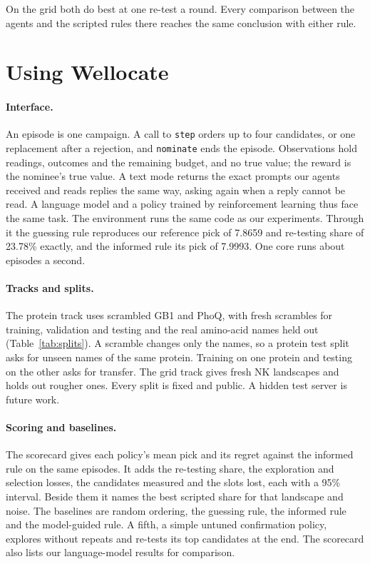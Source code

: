 On the grid both do best at one re-test a round. Every comparison between the agents and the scripted rules there reaches the same conclusion with either rule.



\section{Using Wellocate}
\label{app:using}
\label{app:splits}

\paragraph{Interface.} An episode is one campaign. A call to \texttt{step} orders up to four candidates, or one
replacement after a rejection, and \texttt{nominate} ends the episode. Observations hold readings, outcomes and the
remaining budget, and no true value; the reward is the nominee's true value. A text mode returns the exact prompts our agents received and reads replies the same way, asking again when a reply cannot be read. A language model and a policy trained by reinforcement learning thus face the same task. The environment runs the same code as our experiments. Through it the
guessing rule reproduces our reference pick of 7.8659 and re-testing share of 23.78\% exactly, and the informed rule its pick of 7.9993. One core runs about \nEpisodesPerSec{} episodes a second.

\paragraph{Tracks and splits.} The protein track uses scrambled GB1 and PhoQ, with fresh scrambles for training,
validation and testing and the real amino-acid names held out (Table~\ref{tab:splits}). A scramble changes only the names, so a protein test split asks for unseen names of the same protein. Training on one protein and testing on the other asks for transfer. The grid track gives fresh NK landscapes and holds out rougher ones. Every split is fixed and public. A hidden test server is future work.

\paragraph{Scoring and baselines.} The scorecard gives each policy's mean pick and its regret against the informed rule on the same episodes. It adds the re-testing share, the exploration and selection losses, the candidates measured and the slots lost, each with a 95\% interval. Beside them it names the best scripted share for that landscape and noise.
The baselines are random ordering, the guessing rule, the informed rule and the model-guided rule. A fifth, a simple untuned confirmation policy, explores without repeats and re-tests its top candidates at the end. The scorecard also lists our language-model results for comparison.

